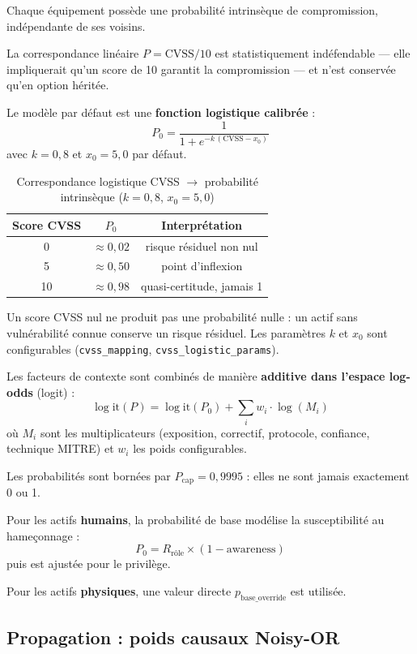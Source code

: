\documentclass[12pt,a4paper]{article}
\newcommand{\forcereset}[1]{}
\begin{document}
Chaque équipement possède une probabilité intrinsèque de compromission, indépendante de ses voisins.

La correspondance linéaire $P = \text{CVSS}/10$ est statistiquement indéfendable --- elle impliquerait qu'un score de 10 garantit la compromission --- et n'est conservée qu'en option héritée.

Le modèle par défaut est une \textbf{fonction logistique calibrée} :
\[
P_0 = \frac{1}{1 + e^{-k\,(\text{CVSS} - x_0)}}
\]
avec $k = 0{,}8$ et $x_0 = 5{,}0$ par défaut.

\begin{table}[H]
\centering
\caption{Correspondance logistique CVSS $\rightarrow$ probabilité intrinsèque ($k=0{,}8$, $x_0=5{,}0$)}
\label{tab:logistic}
\begin{tabular}{ccc}
\toprule
\textbf{Score CVSS} & \textbf{$P_0$} & \textbf{Interprétation} \\
\midrule
0  & $\approx 0{,}02$ & risque résiduel non nul \\
5  & $\approx 0{,}50$ & point d'inflexion \\
10 & $\approx 0{,}98$ & quasi-certitude, jamais 1 \\
\bottomrule
\end{tabular}
\end{table}

Un score CVSS nul ne produit pas une probabilité nulle : un actif sans vulnérabilité connue conserve un risque résiduel. Les paramètres $k$ et $x_0$ sont configurables (\texttt{cvss\_mapping}, \texttt{cvss\_logistic\_params}).

Les facteurs de contexte sont combinés de manière \textbf{additive dans l'espace log-odds} (logit) :
\[
\log\text{it}(P) = \log\text{it}(P_0) + \sum_i w_i \cdot \log(M_i)
\]
où $M_i$ sont les multiplicateurs (exposition, correctif, protocole, confiance, technique MITRE) et $w_i$ les poids configurables.

Les probabilités sont bornées par $P_{\text{cap}} = 0{,}9995$ : elles ne sont jamais exactement 0 ou 1.

Pour les actifs \textbf{humains}, la probabilité de base modélise la susceptibilité au hameçonnage :
\[
P_0 = R_{\text{rôle}} \times (1 - \text{awareness})
\]
puis est ajustée pour le privilège.

Pour les actifs \textbf{physiques}, une valeur directe $p_{\text{base\_override}}$ est utilisée.

\subsection{Propagation : poids causaux Noisy-OR}
\forcereset{5}
\end{document}
